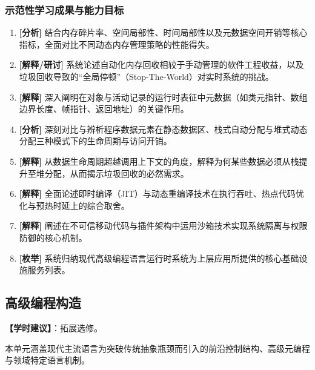 \subsubsection{示范性学习成果与能力目标}
\begin{enumerate}
    \item \textbf{[分析]} 结合内存碎片率、空间局部性、时间局部性以及元数据空间开销等核心指标，全面对比不同动态内存管理策略的性能得失。
    \item \textbf{[解释/研讨]} 系统论述自动化内存回收相较于手动管理的软件工程收益，以及垃圾回收导致的“全局停顿”（Stop-The-World）对实时系统的挑战。
    \item \textbf{[解释]} 深入阐明在对象与活动记录的运行时表征中元数据（如类元指针、数组边界长度、帧指针、返回地址）的关键作用。
    \item \textbf{[分析]} 深刻对比与辨析程序数据元素在静态数据区、栈式自动分配与堆式动态分配三种模式下的生命周期与访问开销。
    \item \textbf{[解释]} 从数据生命周期超越调用上下文的角度，解释为何某些数据必须从栈提升至堆分配，从而揭示垃圾回收的必然需求。
    \item \textbf{[解释]} 全面论述即时编译（JIT）与动态重编译技术在执行吞吐、热点代码优化与预热时延上的综合取舍。
    \item \textbf{[解释]} 阐述在不可信移动代码与插件架构中运用沙箱技术实现系统隔离与权限防御的核心机制。
    \item \textbf{[枚举]} 系统归纳现代高级编程语言运行时系统为上层应用所提供的核心基础设施服务列表。
\end{enumerate}

\subsection{高级编程构造}
\textbf{【学时建议】}：拓展选修。

本单元涵盖现代主流语言为突破传统抽象瓶颈而引入的前沿控制结构、高级元编程与领域特定语言机制。

